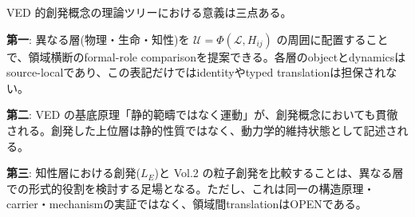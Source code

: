 VED 的創発概念の理論ツリーにおける意義は三点ある。

\textbf{第一}: 異なる層(物理・生命・知性)を $\mathcal{U} = \Phi(\mathcal{L}, H_{ij})$ の周囲に配置することで、領域横断のformal-role comparisonを提案できる。各層のobjectとdynamicsはsource-localであり、この表記だけではidentityやtyped translationは担保されない。

\textbf{第二}: VED の基底原理「静的範疇ではなく運動」が、創発概念においても貫徹される。創発した上位層は静的性質ではなく、動力学的維持状態として記述される。

\textbf{第三}: 知性層における創発($L_E$)と Vol.2 の粒子創発を比較することは、異なる層での形式的役割を検討する足場となる。ただし、これは同一の構造原理・carrier・mechanismの実証ではなく、領域間translationはOPENである。

\bigskip
